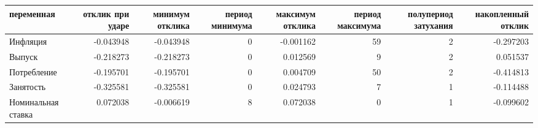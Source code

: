 \begin{tabular}{lrrrrrrr}
\toprule
переменная & отклик при ударе & минимум отклика & период минимума & максимум отклика & период максимума & полупериод затухания & накопленный отклик \\
\midrule
Инфляция & -0.043948 & -0.043948 & 0 & -0.001162 & 59 & 2 & -0.297203 \\
Выпуск & -0.218273 & -0.218273 & 0 & 0.012569 & 9 & 2 & 0.051537 \\
Потребление & -0.195701 & -0.195701 & 0 & 0.004709 & 50 & 2 & -0.414813 \\
Занятость & -0.325581 & -0.325581 & 0 & 0.024793 & 7 & 1 & -0.114488 \\
Номинальная ставка & 0.072038 & -0.006619 & 8 & 0.072038 & 0 & 1 & -0.099602 \\
\bottomrule
\end{tabular}
